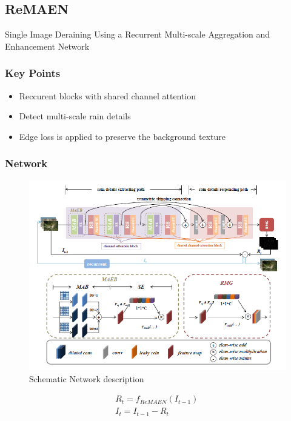 \documentclass{article}
\begin{document}
\subsection{ReMAEN}
Single Image Deraining Using a Recurrent Multi-scale Aggregation and Enhancement Network

\subsubsection{Key Points}
\begin{itemize}
\item Reccurent blocks with shared channel attention
\item Detect multi-scale rain details
\item Edge loss is applied to preserve the background texture
\end{itemize}

\subsubsection{Network}
\begin{figure}[H]
\centering
\includegraphics[width=\linewidth]{ReMAEN}
\caption{Schematic Network description}
\end{figure}

\begin{equation}
\begin{split}
R_t= f_{ReMAEN}(I_{t-1})\, \\
I_t=I_{t-1}-R_t\\
\end{split}
\end{equation}
\end{document}
